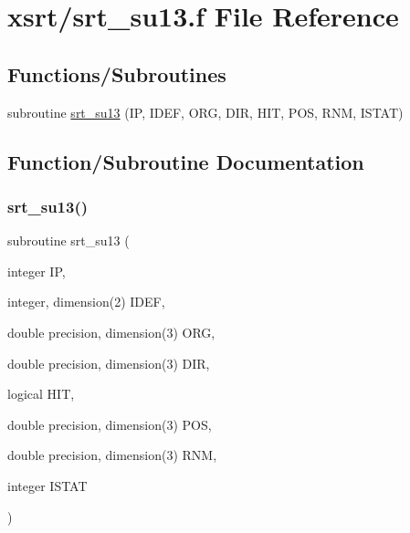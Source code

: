 \hypertarget{srt__su13_8f}{}\section{xsrt/srt\+\_\+su13.f File Reference}
\label{srt__su13_8f}
\subsection*{Functions/\+Subroutines}
\begin{DoxyCompactItemize}
\item 
subroutine \hyperlink{srt__su13_8f_a095c8890bde260ae013475019914514d}{srt\+\_\+su13} (IP, I\+D\+EF, O\+RG, D\+IR, H\+IT, P\+OS, R\+NM, I\+S\+T\+AT)
\end{DoxyCompactItemize}


\subsection{Function/\+Subroutine Documentation}
\mbox{\label{srt__su13_8f_a095c8890bde260ae013475019914514d}} 
\subsubsection{\texorpdfstring{srt\+\_\+su13()}{srt\_su13()}}
{\footnotesize\ttfamily subroutine srt\+\_\+su13 (\begin{DoxyParamCaption}\item[{integer}]{IP,  }\item[{integer, dimension(2)}]{I\+D\+EF,  }\item[{double precision, dimension(3)}]{O\+RG,  }\item[{double precision, dimension(3)}]{D\+IR,  }\item[{logical}]{H\+IT,  }\item[{double precision, dimension(3)}]{P\+OS,  }\item[{double precision, dimension(3)}]{R\+NM,  }\item[{integer}]{I\+S\+T\+AT }\end{DoxyParamCaption})}

